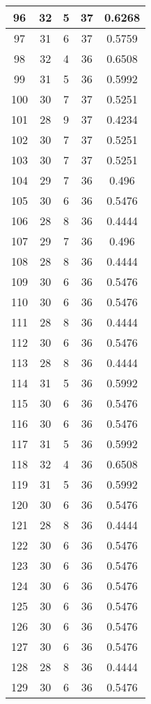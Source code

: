 \documentclass[letterpaper, 12pt]{article}
\begin{document}
\begin{longtable}{|c|c|c|c|c|}
\hline
96 & 32 & 5 & 37 & 0.6268 \\
\hline
97 & 31 & 6 & 37 & 0.5759 \\
\hline
98 & 32 & 4 & 36 & 0.6508 \\
\hline
99 & 31 & 5 & 36 & 0.5992 \\
\hline
100 & 30 & 7 & 37 & 0.5251 \\
\hline
101 & 28 & 9 & 37 & 0.4234 \\
\hline
102 & 30 & 7 & 37 & 0.5251 \\
\hline
103 & 30 & 7 & 37 & 0.5251 \\
\hline
104 & 29 & 7 & 36 & 0.496 \\
\hline
105 & 30 & 6 & 36 & 0.5476 \\
\hline
106 & 28 & 8 & 36 & 0.4444 \\
\hline
107 & 29 & 7 & 36 & 0.496 \\
\hline
108 & 28 & 8 & 36 & 0.4444 \\
\hline
109 & 30 & 6 & 36 & 0.5476 \\
\hline
110 & 30 & 6 & 36 & 0.5476 \\
\hline
111 & 28 & 8 & 36 & 0.4444 \\
\hline
112 & 30 & 6 & 36 & 0.5476 \\
\hline
113 & 28 & 8 & 36 & 0.4444 \\
\hline
114 & 31 & 5 & 36 & 0.5992 \\
\hline
115 & 30 & 6 & 36 & 0.5476 \\
\hline
116 & 30 & 6 & 36 & 0.5476 \\
\hline
117 & 31 & 5 & 36 & 0.5992 \\
\hline
118 & 32 & 4 & 36 & 0.6508 \\
\hline
119 & 31 & 5 & 36 & 0.5992 \\
\hline
120 & 30 & 6 & 36 & 0.5476 \\
\hline
121 & 28 & 8 & 36 & 0.4444 \\
\hline
122 & 30 & 6 & 36 & 0.5476 \\
\hline
123 & 30 & 6 & 36 & 0.5476 \\
\hline
124 & 30 & 6 & 36 & 0.5476 \\
\hline
125 & 30 & 6 & 36 & 0.5476 \\
\hline
126 & 30 & 6 & 36 & 0.5476 \\
\hline
127 & 30 & 6 & 36 & 0.5476 \\
\hline
128 & 28 & 8 & 36 & 0.4444 \\
\hline
129 & 30 & 6 & 36 & 0.5476 \\

\end{longtable}
\end{document}
